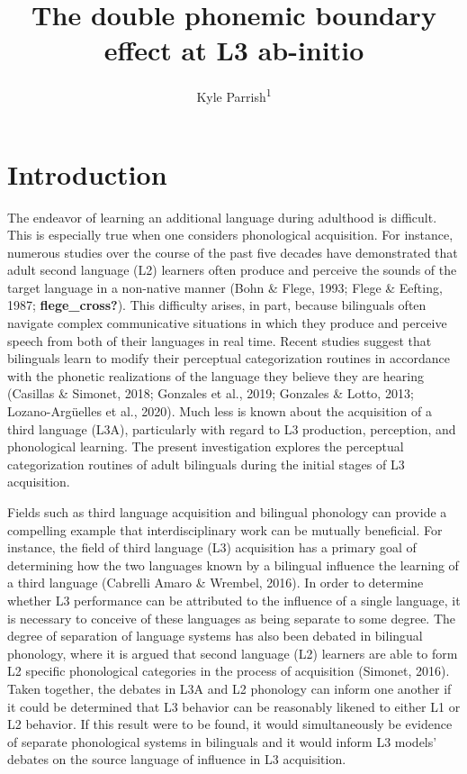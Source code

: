 \documentclass[
  man,floatsintext]{apa6}
\title{The double phonemic boundary effect at L3 ab-initio}
\author{Kyle Parrish\textsuperscript{1}}
\date{}
\affiliation{\vspace{0.5cm}\textsuperscript{1} Goethe University Frankfurt}
\begin{document}
\maketitle

\hypertarget{introduction}{%
\section{Introduction}\label{introduction}}

The endeavor of learning an additional language during adulthood is difficult.
This is especially true when one considers phonological acquisition.
For instance, numerous studies over the course of the past five decades have demonstrated that adult second language (L2) learners often produce and perceive the sounds of the target language in a non-native manner (Bohn \& Flege, 1993; Flege \& Eefting, 1987; \textbf{flege\_cross?}).
This difficulty arises, in part, because bilinguals often navigate complex communicative situations in which they produce and perceive speech from both of their languages in real time.
Recent studies suggest that bilinguals learn to modify their perceptual categorization routines in accordance with the phonetic realizations of the language they believe they are hearing (Casillas \& Simonet, 2018; Gonzales et al., 2019; Gonzales \& Lotto, 2013; Lozano-Argüelles et al., 2020).
Much less is known about the acquisition of a third language (L3A), particularly with regard to L3 production, perception, and phonological learning.
The present investigation explores the perceptual categorization routines of adult bilinguals during the initial stages of L3 acquisition.

Fields such as third language acquisition and bilingual phonology can provide a compelling example that interdisciplinary work can be mutually beneficial.
For instance, the field of third language (L3) acquisition has a primary goal of determining how the two languages known by a bilingual influence the learning of a third language (Cabrelli Amaro \& Wrembel, 2016).
In order to determine whether L3 performance can be attributed to the influence of a single language, it is necessary to conceive of these languages as being separate to some degree.
The degree of separation of language systems has also been debated in bilingual phonology, where it is argued that second language (L2) learners are able to form L2 specific phonological categories in the process of acquisition (Simonet, 2016).
Taken together, the debates in L3A and L2 phonology can inform one another if it could be determined that L3 behavior can be reasonably likened to either L1 or L2 behavior.
If this result were to be found, it would simultaneously be evidence of separate phonological systems in bilinguals and it would inform L3 models' debates on the source language of influence in L3 acquisition.
\end{document}

